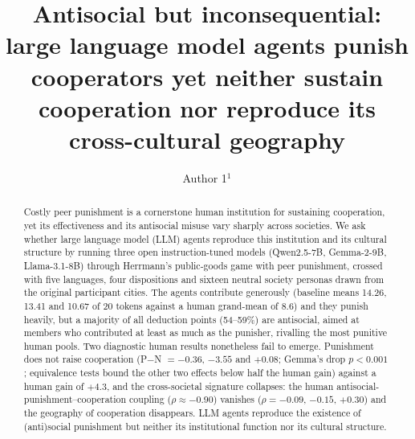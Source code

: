 \documentclass[openacc]{rsproca_new}
\begin{document}
\title{Antisocial but inconsequential: large language model agents punish cooperators yet neither sustain cooperation nor reproduce its cross-cultural geography}

\author{Author 1$^{1}$}

\address{$^{1}$Affiliation, City, Country}

\subject{behavioural ecology, computational social science, artificial intelligence}



\begin{abstract}
Costly peer punishment is a cornerstone human institution for sustaining cooperation, yet its effectiveness and its antisocial misuse vary sharply across societies. We ask whether large language model (LLM) agents reproduce this institution and its cultural structure by running three open instruction-tuned models (Qwen2.5-7B, Gemma-2-9B, Llama-3.1-8B) through Herrmann's public-goods game with peer punishment, crossed with five languages, four dispositions and sixteen neutral society personas drawn from the original participant cities. The agents contribute generously (baseline means 14.26, 13.41 and 10.67 of 20 tokens against a human grand-mean of 8.6) and they punish heavily, but a majority of all deduction points (54--59\%) are antisocial, aimed at members who contributed at least as much as the punisher, rivalling the most punitive human pools. Two diagnostic human results nonetheless fail to emerge. Punishment does not raise cooperation (P$-$N $=-0.36$, $-3.55$ and $+0.08$; Gemma's drop $p<0.001$; equivalence tests bound the other two effects below half the human gain) against a human gain of $+4.3$, and the cross-societal signature collapses: the human antisocial-punishment--cooperation coupling ($\rho\approx-0.90$) vanishes ($\rho=-0.09$, $-0.15$, $+0.30$) and the geography of cooperation disappears. LLM agents reproduce the existence of (anti)social punishment but neither its institutional function nor its cultural structure.
\end{abstract}
\end{document}
